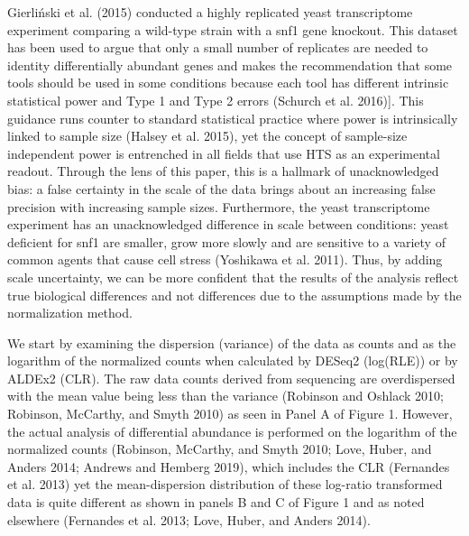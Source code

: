 \documentclass[
]{article}
\begin{document}
Gierliński et al. (2015) conducted a highly replicated yeast
transcriptome experiment comparing a wild-type strain with a snf1 gene
knockout. This dataset has been used to argue that only a small number
of replicates are needed to identity differentially abundant genes and
makes the recommendation that some tools should be used in some
conditions because each tool has different intrinsic statistical power
and Type 1 and Type 2 errors (Schurch et al. 2016){]}. This guidance
runs counter to standard statistical practice where power is
intrinsically linked to sample size (Halsey et al. 2015), yet the
concept of sample-size independent power is entrenched in all fields
that use HTS as an experimental readout. Through the lens of this paper,
this is a hallmark of unacknowledged bias: a false certainty in the
scale of the data brings about an increasing false precision with
increasing sample sizes. Furthermore, the yeast transcriptome experiment
has an unacknowledged difference in scale between conditions: yeast
deficient for snf1 are smaller, grow more slowly and are sensitive to a
variety of common agents that cause cell stress (Yoshikawa et al. 2011).
Thus, by adding scale uncertainty, we can be more confident that the
results of the analysis reflect true biological differences and not
differences due to the assumptions made by the normalization method.

We start by examining the dispersion (variance) of the data as counts
and as the logarithm of the normalized counts when calculated by DESeq2
(log(RLE)) or by ALDEx2 (CLR). The raw data counts derived from
sequencing are overdispersed with the mean value being less than the
variance (Robinson and Oshlack 2010; Robinson, McCarthy, and Smyth 2010)
as seen in Panel A of Figure 1. However, the actual analysis of
differential abundance is performed on the logarithm of the normalized
counts (Robinson, McCarthy, and Smyth 2010; Love, Huber, and Anders
2014; Andrews and Hemberg 2019), which includes the CLR (Fernandes et
al. 2013) yet the mean-dispersion distribution of these log-ratio
transformed data is quite different as shown in panels B and C of Figure
1 and as noted elsewhere (Fernandes et al. 2013; Love, Huber, and Anders
2014).
\end{document}
